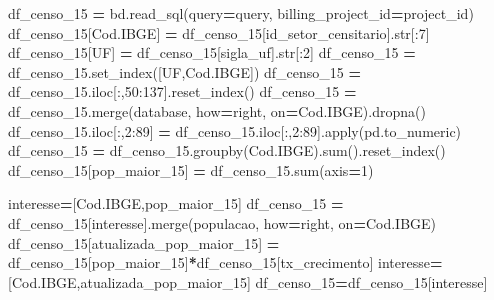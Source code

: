 \documentclass[
  12,
  dvipsnames]{article}
\newenvironment{Shaded}{\begin{snugshade}}{\end{snugshade}}
\newcommand{\BuiltInTok}[1]{#1}
\newcommand{\DecValTok}[1]{\textcolor[rgb]{0.00,0.00,0.81}{#1}}
\newcommand{\NormalTok}[1]{#1}
\newcommand{\OperatorTok}[1]{\textcolor[rgb]{0.81,0.36,0.00}{\textbf{#1}}}
\newcommand{\StringTok}[1]{\textcolor[rgb]{0.31,0.60,0.02}{#1}}
\begin{document}
\begin{Shaded}
\begin{Highlighting}[]
\NormalTok{df\_censo\_15 }\OperatorTok{=}\NormalTok{ bd.read\_sql(query}\OperatorTok{=}\NormalTok{query, billing\_project\_id}\OperatorTok{=}\NormalTok{project\_id)}
\NormalTok{df\_censo\_15[}\StringTok{\textquotesingle{}Cod.IBGE\textquotesingle{}}\NormalTok{] }\OperatorTok{=}\NormalTok{ df\_censo\_15[}\StringTok{\textquotesingle{}id\_setor\_censitario\textquotesingle{}}\NormalTok{].}\BuiltInTok{str}\NormalTok{[:}\DecValTok{7}\NormalTok{]}
\NormalTok{df\_censo\_15[}\StringTok{\textquotesingle{}UF\textquotesingle{}}\NormalTok{] }\OperatorTok{=}\NormalTok{ df\_censo\_15[}\StringTok{\textquotesingle{}sigla\_uf\textquotesingle{}}\NormalTok{].}\BuiltInTok{str}\NormalTok{[:}\DecValTok{2}\NormalTok{]}
\NormalTok{df\_censo\_15 }\OperatorTok{=}\NormalTok{ df\_censo\_15.set\_index([}\StringTok{\textquotesingle{}UF\textquotesingle{}}\NormalTok{,}\StringTok{\textquotesingle{}Cod.IBGE\textquotesingle{}}\NormalTok{])}
\NormalTok{df\_censo\_15 }\OperatorTok{=}\NormalTok{ df\_censo\_15.iloc[:,}\DecValTok{50}\NormalTok{:}\DecValTok{137}\NormalTok{].reset\_index()}
\NormalTok{df\_censo\_15 }\OperatorTok{=}\NormalTok{ df\_censo\_15.merge(database, how}\OperatorTok{=}\StringTok{\textquotesingle{}right\textquotesingle{}}\NormalTok{, on}\OperatorTok{=}\StringTok{\textquotesingle{}Cod.IBGE\textquotesingle{}}\NormalTok{).dropna()}
\NormalTok{df\_censo\_15.iloc[:,}\DecValTok{2}\NormalTok{:}\DecValTok{89}\NormalTok{] }\OperatorTok{=}\NormalTok{ df\_censo\_15.iloc[:,}\DecValTok{2}\NormalTok{:}\DecValTok{89}\NormalTok{].}\BuiltInTok{apply}\NormalTok{(pd.to\_numeric)}
\NormalTok{df\_censo\_15 }\OperatorTok{=}\NormalTok{ df\_censo\_15.groupby(}\StringTok{\textquotesingle{}Cod.IBGE\textquotesingle{}}\NormalTok{).}\BuiltInTok{sum}\NormalTok{().reset\_index()}
\NormalTok{df\_censo\_15[}\StringTok{\textquotesingle{}pop\_maior\_15\textquotesingle{}}\NormalTok{] }\OperatorTok{=}\NormalTok{ df\_censo\_15.}\BuiltInTok{sum}\NormalTok{(axis}\OperatorTok{=}\DecValTok{1}\NormalTok{)}

\NormalTok{interesse}\OperatorTok{=}\NormalTok{[}\StringTok{\textquotesingle{}Cod.IBGE\textquotesingle{}}\NormalTok{,}\StringTok{\textquotesingle{}pop\_maior\_15\textquotesingle{}}\NormalTok{]}
\NormalTok{df\_censo\_15 }\OperatorTok{=}\NormalTok{ df\_censo\_15[interesse].merge(populacao, how}\OperatorTok{=}\StringTok{\textquotesingle{}right\textquotesingle{}}\NormalTok{, on}\OperatorTok{=}\StringTok{\textquotesingle{}Cod.IBGE\textquotesingle{}}\NormalTok{)}
\NormalTok{df\_censo\_15[}\StringTok{\textquotesingle{}atualizada\_pop\_maior\_15\textquotesingle{}}\NormalTok{] }\OperatorTok{=}\NormalTok{ df\_censo\_15[}\StringTok{\textquotesingle{}pop\_maior\_15\textquotesingle{}}\NormalTok{]}\OperatorTok{*}\NormalTok{df\_censo\_15[}\StringTok{\textquotesingle{}tx\_crecimento\textquotesingle{}}\NormalTok{]}
\NormalTok{interesse}\OperatorTok{=}\NormalTok{[}\StringTok{\textquotesingle{}Cod.IBGE\textquotesingle{}}\NormalTok{,}\StringTok{\textquotesingle{}atualizada\_pop\_maior\_15\textquotesingle{}}\NormalTok{]}
\NormalTok{df\_censo\_15}\OperatorTok{=}\NormalTok{df\_censo\_15[interesse]}


\end{Highlighting}
\end{Shaded}
\end{document}
